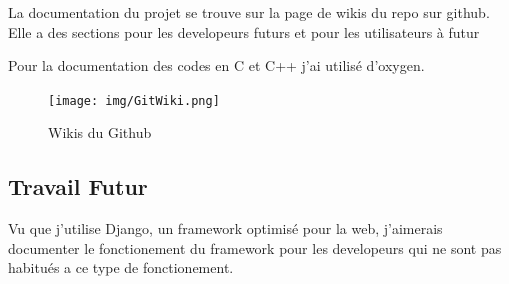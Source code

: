 \documentclass[12pt]{article}
\begin{document}
\begin{par}
	La documentation du projet se trouve sur la page de wikis du repo
	sur github. Elle a des sections pour les developeurs futurs et pour
	les utilisateurs à futur
\end{par}
\begin{par}
	Pour la documentation des codes en C et C++ j'ai utilisé d'oxygen.
\end{par}

\begin{figure}[!htb]
	\centering
	\texttt{[image: img/GitWiki.png]}
	\caption{Wikis du Github}
	\label{img:git:wikis1}
\end{figure}

\subsection*{Travail Futur}
\begin{par}
	Vu que j'utilise Django, un framework optimisé pour la web, j'aimerais 
	documenter le fonctionement du framework pour les developeurs qui ne
	sont pas habitués a ce type de fonctionement.
\end{par}


\end{document}
